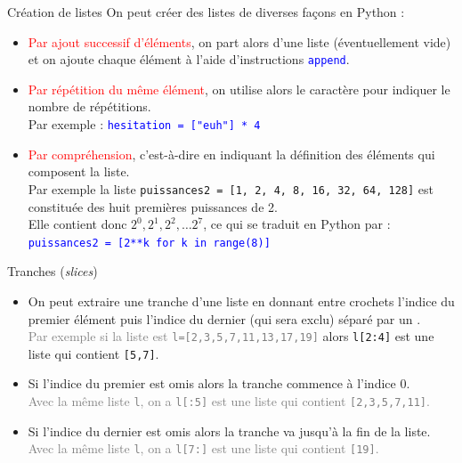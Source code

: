 \documentclass[10pt]{beamer}
\begin{document}
\begin{frame}[fragile]{\Ctitle}{\stitle}
	\begin{alertblock}{Création de listes}
		On peut créer des listes de diverses façons en Python :
		\begin{itemize}
			\item<2-> \textcolor{red}{Par ajout successif d'éléments}, on part alors d'une liste (éventuellement vide) et on ajoute chaque élément à l'aide d'instructions \textcolor{blue}{\tt append}.
			\item<3-> \textcolor{red}{Par répétition du même élément}, on utilise alors le caractère \textcolor{blue}{\tt *} pour indiquer le nombre de répétitions. \\
				\onslide<4-> {Par exemple : \textcolor{blue}{\tt hesitation = ["euh"] * 4}}
			\item<6-> \textcolor{red}{Par compréhension}, c'est-à-dire en indiquant la définition des éléments qui composent la liste. \\
				\onslide<7-> {Par exemple la liste {\tt puissances2 = [1, 2, 4, 8, 16, 32, 64, 128]} est constituée des huit premières puissances de 2.} \\
				\onslide<8-> {Elle contient donc $2^0, 2^1, 2^2, \dots 2^7$, ce qui se traduit en Python par :}\\
				\onslide<9-> \textcolor{blue}{\tt puissances2 = [2**k for k in range(8)]}
		\end{itemize}
	\end{alertblock}
\end{frame}

\begin{frame}[fragile]{\Ctitle}{\stitle}
	\begin{alertblock}{Tranches (\textit{slices})}
		\begin{itemize}
			\item<1->On peut extraire une tranche d'une liste en donnant entre crochets l'indice du premier élément puis l'indice du dernier (qui sera exclu) séparé par un \kw{:}.\\
			\onslide<2->\textcolor{gray}{\small Par exemple si la liste est {\tt l=[2,3,5,7,11,13,17,19]}} alors {\tt l[2:4]} est une liste qui contient {\tt [5,7]}.
			\item<3-> Si l'indice du premier est omis alors la tranche commence à l'indice 0.\\
				\onslide<4->\textcolor{gray}{\small Avec la même liste {\tt l}, on a {\tt l[:5]} est une liste qui contient {\tt [2,3,5,7,11]}.}
			\item<5-> Si l'indice du dernier est omis alors la tranche va jusqu'à la fin de la liste.\\
				\onslide<6->\textcolor{gray}{\small Avec la même liste {\tt l}, on a {\tt l[7:]} est une liste qui contient {\tt [19]}.}
		\end{itemize}
	\end{alertblock}
\end{frame}
\end{document}
